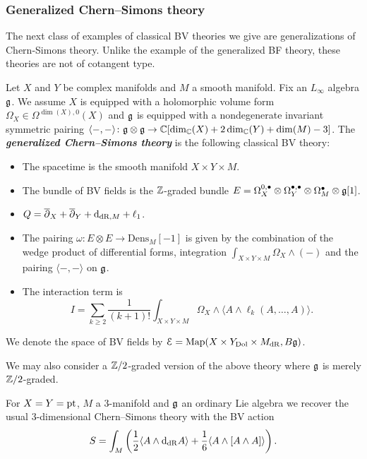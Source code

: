 \documentclass[10pt, oneside]{article}
\newcommand{\Dens}{\mathrm{Dens}}
\newcommand{\defterm}[1]{\textbf{\emph{#1}}}
\begin{document}


\subsubsection{Generalized Chern--Simons theory} \label{gen_CS_section}

The next class of examples of classical BV theories we give are generalizations of Chern-Simons theory. Unlike the example of the generalized BF theory, these theories are not of cotangent type.

\begin{definition}
Let $X$ and $Y$ be complex manifolds and $M$ a smooth manifold. Fix an $L_\infty$ algebra $\mathfrak g$. We assume $X$ is equipped with a holomorphic volume form $\Omega_X \in\Omega^{\dim(X), 0}(X)$ and $\mathfrak g$ is equipped with a nondegenerate invariant symmetric pairing $\langle-, -\rangle\colon \mathfrak g\otimes\mathfrak g\rightarrow \mathbb C[\dim_\mathbb C(X) + 2\dim_\mathbb C(Y) + \dim(M) - 3]$. The \defterm{generalized Chern--Simons theory} is the following classical BV theory:
\begin{itemize}
\item The spacetime is the smooth manifold $X\times Y\times M$.

\item The bundle of BV fields is the $\mathbb Z$-graded bundle $E = \Omega^{0,\bullet}_X \otimes \Omega^{\bullet,\bullet}_Y \otimes \Omega^\bullet_M \otimes \mathfrak g[1]$.

\item $Q = \overline{\partial}_X + \overline{\partial}_Y + {\rm d}_{\mathrm{dR}, M} + \ell_1$.

\item The pairing $\omega\colon E\otimes E\rightarrow \Dens_M[-1]$ is given by the combination of the wedge product of differential forms, integration $\int_{X\times Y\times M} \Omega_X\wedge (-)$ and the pairing $\langle -, -\rangle$ on $\mathfrak g$.

\item The interaction term is
\[I = \sum_{k\geq 2}\frac{1}{(k+1)!} \int_{X\times Y\times M} \Omega_X\wedge \langle A\wedge \ell_k(A, \dots, A)\rangle.\]
\end{itemize}
We denote the space of BV fields by $\mathcal E = \operatorname{Map}(X\times Y_{\mathrm{Dol}}\times M_{\mathrm{dR}}, B \mathfrak g)$.
\label{def:generalizedCS}
\end{definition}

We may also consider a $\mathbb Z/2$-graded version of the above theory where $\mathfrak g$ is merely $\mathbb Z/2$-graded.

\begin{example}
For $X=Y=\operatorname{pt}$, $M$ a 3-manifold and $\mathfrak g$ an ordinary Lie algebra we recover the usual 3-dimensional Chern--Simons theory with the BV action
\[S = \int_M \left(\frac{1}{2}\langle A\wedge {\rm d}_{\mathrm{dR}} A\rangle + \frac{1}{6}\langle A\wedge [A\wedge A]\rangle\right).\]
\end{example}
\end{document}

